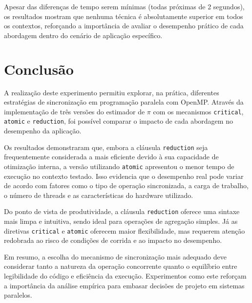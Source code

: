 \documentclass[a4paper, 12pt]{article}
\begin{document}
	Apesar das diferenças de tempo serem mínimas (todas próximas de 2 segundos), os resultados mostram que nenhuma técnica é absolutamente superior em todos os contextos, reforçando a importância de avaliar o desempenho prático de cada abordagem dentro do cenário de aplicação específico.

	\section{Conclusão}
	
	A realização deste experimento permitiu explorar, na prática, diferentes estratégias de sincronização em programação paralela com OpenMP. Através da implementação de três versões do estimador de $\pi$ com os mecanismos \texttt{critical}, \texttt{atomic} e \texttt{reduction}, foi possível comparar o impacto de cada abordagem no desempenho da aplicação.
	
	Os resultados demonstraram que, embora a cláusula \texttt{reduction} seja frequentemente considerada a mais eficiente devido à sua capacidade de otimização interna, a versão utilizando \texttt{atomic} apresentou o menor tempo de execução no contexto testado. Isso evidencia que o desempenho real pode variar de acordo com fatores como o tipo de operação sincronizada, a carga de trabalho, o número de threads e as características do hardware utilizado.
	
	Do ponto de vista de produtividade, a cláusula \texttt{reduction} oferece uma sintaxe mais limpa e intuitiva, sendo ideal para operações de agregação simples. Já as diretivas \texttt{critical} e \texttt{atomic} oferecem maior flexibilidade, mas requerem atenção redobrada ao risco de condições de corrida e ao impacto no desempenho.
	
	Em resumo, a escolha do mecanismo de sincronização mais adequado deve considerar tanto a natureza da operação concorrente quanto o equilíbrio entre legibilidade do código e eficiência da execução. Experimentos como este reforçam a importância da análise empírica para embasar decisões de projeto em sistemas paralelos.
	
	
\end{document}
